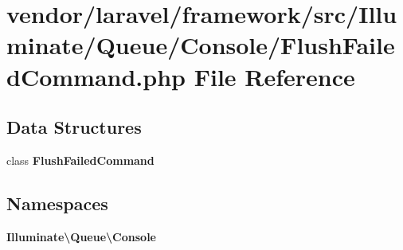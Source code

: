 \section{vendor/laravel/framework/src/\+Illuminate/\+Queue/\+Console/\+Flush\+Failed\+Command.php File Reference}
\label{_flush_failed_command_8php}
\subsection*{Data Structures}
\begin{DoxyCompactItemize}
\item 
class {\bf Flush\+Failed\+Command}
\end{DoxyCompactItemize}
\subsection*{Namespaces}
\begin{DoxyCompactItemize}
\item 
 {\bf Illuminate\textbackslash{}\+Queue\textbackslash{}\+Console}
\end{DoxyCompactItemize}
